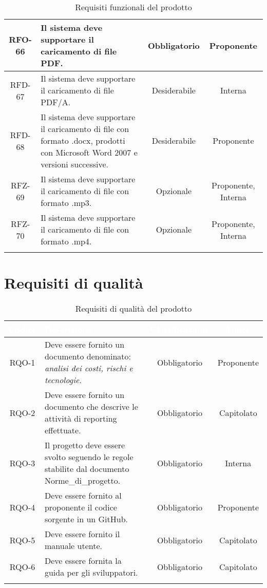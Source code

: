 \begin{xltabular}{\textwidth}{| c | X | c | c |}
    \hline
    RFO-66 & Il sistema deve supportare il caricamento di file PDF. & Obbligatorio & Proponente \\
    \hline
    RFD-67 & Il sistema deve supportare il caricamento di file PDF/A. & Desiderabile & Interna \\
    \hline
    RFD-68 & Il sistema deve supportare il caricamento di  file con formato .docx, prodotti con Microsoft Word 2007 e versioni successive. & Desiderabile & Proponente \\
    \hline
    RFZ-69 & Il sistema deve supportare il caricamento di  file con formato .mp3. & Opzionale & Proponente, Interna \\
    \hline
    RFZ-70 & Il sistema deve supportare il caricamento di  file con formato .mp4. & Opzionale & Proponente, Interna \\
    \hline
    
    
  
     \caption{Requisiti funzionali del prodotto}
    \label{tab:reqfun}
\end{xltabular}
\endgroup
  
\section{Requisiti di qualità}

\begingroup
\setlength{\tabcolsep}{10pt}
\renewcommand{\arraystretch}{1.3}
\begin{xltabular}{\textwidth}{| c | X | c | c |}
    \hline
     \textbf{\textcolor{white}{Codice}} & \textbf{\textcolor{white}{Descrizione}} & \textbf{\textcolor{white}{Classificazione}} & \textbf{\textcolor{white}{Fonte}}\\
    \hline
    \endhead
    RQO-1 & Deve essere fornito un documento denominato:\textit{ analisi dei costi, rischi e tecnologie}. & Obbligatorio & Proponente \\
    \hline
    RQO-2 & Deve essere fornito un documento che descrive le attività di  reporting effettuate. & Obbligatorio & Capitolato \\
    \hline
    RQO-3 & Il progetto deve essere svolto seguendo le regole stabilite dal documento Norme\_di\_progetto. & Obbligatorio & Interna \\
    \hline
    RQO-4 & Deve essere fornito al proponente il codice sorgente in un  GitHub. & Obbligatorio & Proponente \\
    \hline
    RQO-5 & Deve essere fornito il manuale utente. & Obbligatorio & Capitolato \\
    \hline
    RQO-6 & Deve essere fornita la guida per gli sviluppatori. & Obbligatorio & Capitolato \\
     \caption{Requisiti di qualità del prodotto}
    \label{tab:reqqua}
\end{xltabular}
\endgroup
\newpage

